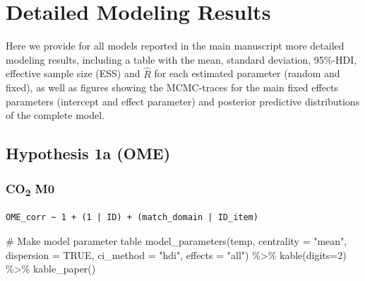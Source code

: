 \documentclass[
  letterpaper,
  DIV=11,
  numbers=noendperiod]{scrartcl}
\newenvironment{Shaded}{\begin{snugshade}}{\end{snugshade}}
\newcommand{\AttributeTok}[1]{\textcolor[rgb]{0.40,0.45,0.13}{#1}}
\newcommand{\CommentTok}[1]{\textcolor[rgb]{0.37,0.37,0.37}{#1}}
\newcommand{\ConstantTok}[1]{\textcolor[rgb]{0.56,0.35,0.01}{#1}}
\newcommand{\DecValTok}[1]{\textcolor[rgb]{0.68,0.00,0.00}{#1}}
\newcommand{\FunctionTok}[1]{\textcolor[rgb]{0.28,0.35,0.67}{#1}}
\newcommand{\NormalTok}[1]{\textcolor[rgb]{0.00,0.23,0.31}{#1}}
\newcommand{\OtherTok}[1]{\textcolor[rgb]{0.00,0.23,0.31}{#1}}
\newcommand{\SpecialCharTok}[1]{\textcolor[rgb]{0.37,0.37,0.37}{#1}}
\newcommand{\StringTok}[1]{\textcolor[rgb]{0.13,0.47,0.30}{#1}}
\begin{document}
\section{Detailed Modeling Results}\label{detailed-modeling-results}

Here we provide for all models reported in the main manuscript more
detailed modeling results, including a table with the mean, standard
deviation, 95\%-HDI, effective sample size (ESS) and \(\hat{R}\) for
each estimated parameter (random and fixed), as well as figures showing
the MCMC-traces for the main fixed effects parameters (intercept and
effect parameter) and posterior predictive distributions of the complete
model.

\subsection{Hypothesis 1a (OME)}\label{hypothesis-1a-ome}

\subsubsection{\texorpdfstring{CO\textsubscript{2}
M0}{CO2 M0}}\label{co2-m0}

\begin{Shaded}
\end{Shaded}

\begin{verbatim}
OME_corr ~ 1 + (1 | ID) + (match_domain | ID_item) 
\end{verbatim}

\begin{Shaded}
\begin{Highlighting}[]
\CommentTok{\# Make model parameter table}
\FunctionTok{model\_parameters}\NormalTok{(temp, }\AttributeTok{centrality =} \StringTok{"mean"}\NormalTok{, }\AttributeTok{dispersion =} \ConstantTok{TRUE}\NormalTok{, }
                 \AttributeTok{ci\_method =} \StringTok{"hdi"}\NormalTok{, }\AttributeTok{effects =} \StringTok{"all"}\NormalTok{) }\SpecialCharTok{\%\textgreater{}\%} 
  \FunctionTok{kable}\NormalTok{(}\AttributeTok{digits=}\DecValTok{2}\NormalTok{) }\SpecialCharTok{\%\textgreater{}\%} \FunctionTok{kable\_paper}\NormalTok{()}
\end{Highlighting}
\end{Shaded}
\end{document}
